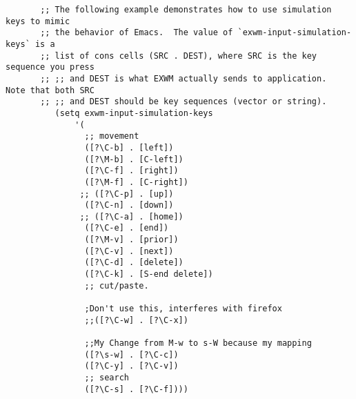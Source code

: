\documentclass[11pt]{article}
\begin{document}
\begin{verbatim}
       ;; The following example demonstrates how to use simulation keys to mimic
       ;; the behavior of Emacs.  The value of `exwm-input-simulation-keys` is a
       ;; list of cons cells (SRC . DEST), where SRC is the key sequence you press
       ;; ;; and DEST is what EXWM actually sends to application.  Note that both SRC
       ;; ;; and DEST should be key sequences (vector or string).
          (setq exwm-input-simulation-keys
              '(
                ;; movement 
                ([?\C-b] . [left])
                ([?\M-b] . [C-left])
                ([?\C-f] . [right])
                ([?\M-f] . [C-right])
               ;; ([?\C-p] . [up])
                ([?\C-n] . [down])
               ;; ([?\C-a] . [home])
                ([?\C-e] . [end])
                ([?\M-v] . [prior])
                ([?\C-v] . [next])
                ([?\C-d] . [delete])
                ([?\C-k] . [S-end delete])
                ;; cut/paste.

                ;Don't use this, interferes with firefox
                ;;([?\C-w] . [?\C-x])

                ;;My Change from M-w to s-W because my mapping
                ([?\s-w] . [?\C-c])
                ([?\C-y] . [?\C-v])
                ;; search
                ([?\C-s] . [?\C-f])))

\end{verbatim}
\end{document}
